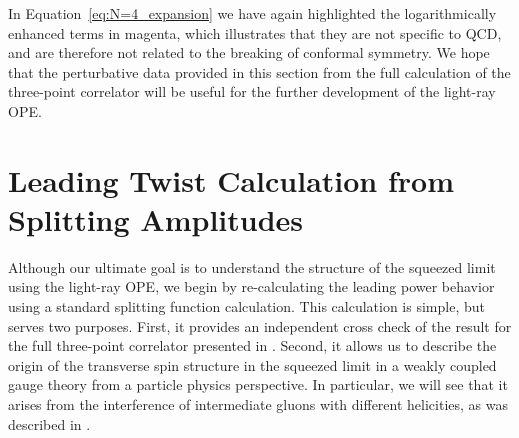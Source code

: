 \documentclass[letterpaper,11pt]{article}
\newcommand{\Eq}[1]{Equation~\eqref{#1}}
\DeclareRobustCommand{\Eq}[1]{Eq.~(\ref{#1})}
\begin{document}
In \Eq{eq:N=4_expansion} we have again highlighted the logarithmically enhanced terms in magenta, which illustrates that they are not specific to QCD, and are therefore not related to the breaking of conformal symmetry.  We hope that the perturbative data provided in this section from the full calculation of the three-point correlator will be useful for the further development of the light-ray OPE.



\section{Leading Twist Calculation from Splitting Amplitudes}\label{sec:amp}

Although our ultimate goal is to understand the structure of the squeezed limit using the light-ray OPE, we begin by re-calculating the leading power behavior using a standard splitting function calculation. This calculation is simple, but serves two purposes. First, it provides an independent cross check of the result for the full three-point correlator presented in \cite{Chen:2019bpb}. Second, it allows us to describe the origin of the transverse spin structure in the squeezed limit in a weakly coupled gauge theory from a particle physics perspective. In particular, we will see that it arises from the interference of intermediate gluons with different helicities, as was described in  \cite{Chen:2020adz}.
\end{document}
